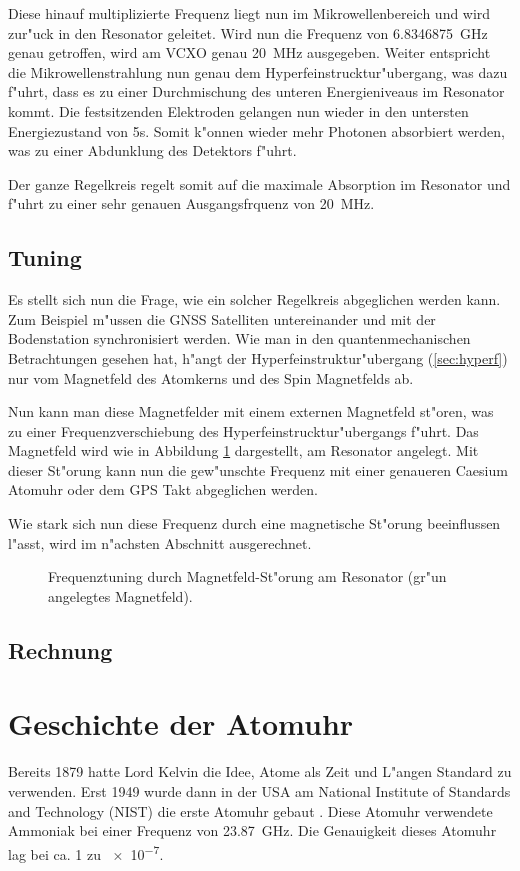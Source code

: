 \begin{refsection}
Diese hinauf multiplizierte Frequenz liegt nun im Mikrowellenbereich
und wird zur"uck in den Resonator geleitet.  Wird nun die Frequenz von
\SI{6.8346875}{\giga\hertz} genau getroffen, wird am VCXO genau
\SI{20}{\mega\hertz} ausgegeben.  Weiter entspricht die
Mikrowellenstrahlung nun genau dem Hyperfeinstrucktur"ubergang, was
dazu f"uhrt, dass es zu einer Durchmischung des unteren Energieniveaus
im Resonator kommt.  Die festsitzenden Elektroden gelangen nun wieder
in den untersten Energiezustand von 5s.  Somit k"onnen wieder mehr
Photonen absorbiert werden, was zu einer Abdunklung des Detektors
f"uhrt.

Der ganze Regelkreis regelt somit auf die maximale Absorption im
Resonator und f"uhrt zu einer sehr genauen Ausgangsfrquenz von
\SI{20}{\mega\hertz}.

\subsection{Tuning}
Es stellt sich nun die Frage, wie ein solcher Regelkreis abgeglichen
werden kann.  Zum Beispiel m"ussen die GNSS Satelliten untereinander
und mit der Bodenstation synchronisiert werden.  Wie man in den
quantenmechanischen Betrachtungen gesehen hat, h"angt der
Hyperfeinstruktur"ubergang (\ref{sec:hyperf}) nur vom Magnetfeld des
Atomkerns und des Spin Magnetfelds ab.

Nun kann man diese Magnetfelder mit einem externen Magnetfeld st"oren,
was zu einer Frequenzverschiebung des Hyperfeinstrucktur"ubergangs
f"uhrt.  Das Magnetfeld wird wie in Abbildung \ref{fig:tuning}
dargestellt, am Resonator angelegt.  Mit dieser St"orung kann nun die
gew"unschte Frequenz mit einer genaueren Caesium Atomuhr oder dem GPS
Takt abgeglichen werden.

Wie stark sich nun diese Frequenz durch eine magnetische St"orung
beeinflussen l"asst, wird im n"achsten Abschnitt ausgerechnet.

\begin{figure}
  \centering
  
  \caption{Frequenztuning durch Magnetfeld-St"orung am Resonator
    (gr"un angelegtes Magnetfeld).}
  \label{fig:tuning}
\end{figure}

\subsection{Rechnung}

\section{Geschichte der Atomuhr}
\label{sec:gesch-der-atom}
Bereits 1879 hatte Lord Kelvin die Idee, Atome als Zeit und L"angen
Standard zu verwenden.  Erst 1949 wurde dann in der USA am National
Institute of Standards and Technology (NIST) die erste Atomuhr gebaut
\cite{ieee:nist}.  Diese Atomuhr verwendete Ammoniak bei einer
Frequenz von \SI{23.87}{\giga\hertz}.  Die Genauigkeit dieses Atomuhr
lag bei ca. 1 zu \num{e-7}.


\end{refsection}
